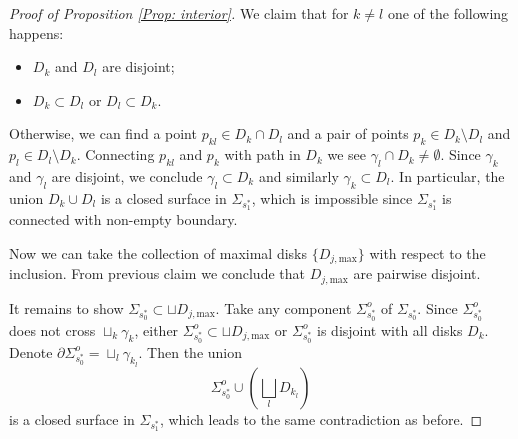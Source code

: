 \documentclass[10pt,a4paper]{amsart}
\begin{document}
\begin{proof}[Proof of Proposition \ref{Prop: interior}]
We claim that for $k\neq l$ one of the following happens:
\begin{itemize}\setlength{\itemsep}{1mm}
\item $D_k$ and $D_l$ are disjoint;
\item $D_k\subset D_l$ or $D_l\subset D_k$.
\end{itemize}
Otherwise, we can find a point $p_{kl}\in D_k\cap D_l$ and a pair of points $p_k\in D_k\setminus D_l$ and $p_l\in D_l\setminus D_k$. Connecting $p_{kl}$ and $p_k$ with path in $D_k$ we see $\gamma_l\cap D_k\neq\emptyset$. Since $\gamma_k$ and $\gamma_l$ are disjoint, we conclude $\gamma_l\subset D_k$ and similarly $\gamma_k\subset D_l$. In particular, the union $D_k\cup D_l$ is a closed surface in $\Sigma_{s_1^*}$, which is impossible since $\Sigma_{s_1^*}$ is connected with non-empty boundary.

Now we can take the collection of maximal disks $\{D_{j,\mathrm{max}}\}$ with respect to the inclusion. From previous claim we conclude that $D_{j,\mathrm{max}}$ are pairwise disjoint.

It remains to show $\Sigma_{s_0^*}\subset \sqcup D_{j,\mathrm{max}}$. Take any component $\Sigma_{s_0^*}^o$ of $\Sigma_{s_0^*}$. Since $\Sigma_{s_0^*}^o$ does not cross $\sqcup_k\gamma_k$, either $\Sigma_{s_0^*}^o\subset \sqcup D_{j,\mathrm{max}}$ or $\Sigma_{s_0^*}^o$ is disjoint with all disks $D_k$. Denote $\partial\Sigma_{s_0^*}^o=\sqcup_l \gamma_{k_l}$. Then the union
$$
\Sigma_{s_0^*}^o\cup\left(\bigsqcup_lD_{k_l}\right)
$$
is a closed surface in $\Sigma_{s_1^*}$, which leads to the same contradiction as before.



\end{proof}
\end{document}
